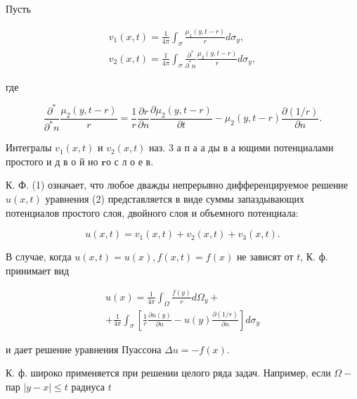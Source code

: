 \documentclass[10pt]{article}
\begin{document}
Пусть



\[

\begin{gathered}

v_{1}(x, t)=\frac{1}{4 \pi} \int_{\sigma} \frac{\mu_{1}(y, t-r)}{r} d \sigma_{y}, \\

v_{2}(x, t)=\frac{1}{4 \pi} \int_{\sigma} \frac{\partial^{*}}{\partial^{*} n} \frac{\mu_{2}(y, t-r)}{r} d \sigma_{y},

\end{gathered}

\]



где



\[

\frac{\partial^{*}}{\partial^{*} n} \frac{\mu_{2}(y, t-r)}{r}=\frac{1}{r} \frac{\partial r}{\partial n} \frac{\partial \mu_{2}(y, t-r)}{\partial t}-\mu_{2}(y, t-r) \frac{\partial(1 / r)}{\partial n} .

\]



Интегралы $v_{1}(x, t)$ и $v_{2}(x, t)$ наз. 3 а п а $а$ ды в а ющими потенциалами простого и д в о й но $\mathbf{r} о$ с л о е в.



К. Ф. (1) означает, что любое дважды непрерывно дифференцируемое решение $u(x, t)$ уравнения (2) представляется в виде суммы запаздывающих потенциалов простого слоя, двойного слоя и объемного потенциала:



\[

u(x, t)=v_{1}(x, t)+v_{2}(x, t)+v_{3}(x, t) .

\]



В случае, когда $u(x, t)=u(x), f(x, t)=f(x)$ не зависят от $t$, К. ф. принимает вид



\[

\begin{gathered}

u(x)=\frac{1}{4 \pi} \int_{\Omega} \frac{f(y)}{r} d \Omega_{y}+ \\

+\frac{1}{4 \pi} \int_{\sigma}\left[\frac{1}{r} \frac{\partial u(y)}{\partial n}-u(y) \frac{\partial(1 / r)}{\partial n}\right] d \sigma_{y}

\end{gathered}

\]



и дает решение уравнения Пуассона $\Delta u=-f(x)$.



К. ф. широко применяется при решении целого ряда задач. Например, если $\Omega-$ пар $|y-x| \leqslant t$ радиуса $t$
\end{document}
